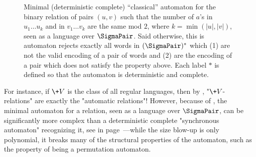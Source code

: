 \begin{figure}[tbp]
	\begin{center}
	\end{center}
	\caption{
		\AP\label{fig:min-auto}
		Minimal (deterministic complete) ``classical'' automaton for 
		the binary relation
		of pairs $(u,v)$ such that the number of $a$'s in $u_1\dotsc u_k$
		and in $v_1\dotsc v_k$ are the same mod $2$, where $k = \min(|u|, |v|)$,
		seen as a language over $\SigmaPair$.
		Said otherwise, this is automaton rejects exactly all words in $(\SigmaPair)^*$ which (1)
		are not the valid encoding of a pair of words and (2) are the encoding of a pair
		which does not satisfy the property above.
		Each label $*$ is defined so that the automaton is deterministic and complete.
	} 
\end{figure}
For instance, if $\+V$ is the class of all regular languages, then by
, "$\+V$-relations" are exactly the "automatic relations"!
However, because of
, the minimal automaton for a relation, seen as a language over $\SigmaPair$,
can be significantly more complex than a deterministic complete "synchronous automaton" recognizing it, see  in page~\pageref{fig:min-auto}---while the size blow-up is only polynomial, it breaks many of the structural properties of the automaton, such as the property of being a permutation automaton.

